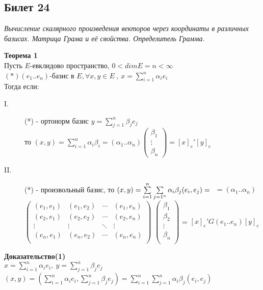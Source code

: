 \subsection{Билет 24}


\textit{Вычисление скалярного произведения векторов через координаты в различных базисах. Матрица Грама и её свойства. Определитель Грамма.}


\textbf{Теорема 1} \\
Пусть $E$-евклидово пространство, $0<dimE=n<\infty$ \\
$(*)(e_1..e_n)$-базис в $E, \forall x,y \in E\ , \ x=\sum \limits_{i=1}^n {\alpha_i e_i} $ \\
Тогда если:
\begin{description}
 \item [I.] (*) - ортонорм базис $y=\sum \limits_{j=1}^n {\beta_j e_j}$ \\
	то $(x,y)=\sum \limits_{i=1}^n {\alpha_i \beta_i} = (\alpha_1..\alpha_n) \begin{pmatrix} \beta_1 \\ \vdots \\ \beta_n \end{pmatrix} = [x]_e'[y]_e$
 \item [II.] (*) - произвольный базис, то $(x,y)=\sum \limits_{i=1}^n \sum \limits_{j=1^n} {\alpha_i \beta_j(e_i,e_j)} = \\ $
       $= (\alpha_1 .. \alpha_n)$ 
       $\begin{pmatrix}
         (e_1,e_1) & (e_1,e_2) & \cdots & (e_1,e_n) \\
         (e_2,e_1) & (e_2,e_2) & \cdots & (e_2,e_n) \\
         \vdots & \vdots & \ddots & \vdots \\
         (e_n,e_1) & (e_n,e_2) & \cdots & (e_n,e_n) \\
        \end{pmatrix}$
       $\begin{pmatrix}
         \beta_1 \\ \beta_2 \\ \vdots \\ \beta_n \\
        \end{pmatrix}$ = 
       $[x]_e'G(e_1..e_n)[y]_e$ 
\end{description}
\textbf{Доказательство(1)} \\
$x=\sum \limits_{i=1}^n {\alpha_i e_i}, \ y=\sum \limits_{j=1}^n {\beta_j e_j} $ \\
$(x,y)=\left( \sum \limits_{i=1}^n {\alpha_i e_i},\sum \limits_{j=1}^n {\beta_j e_j} \right) = \sum \limits_{i=1}^n \sum \limits_{j=1}^n {\alpha_i \beta_j (e_i,e_j)} $ \\
